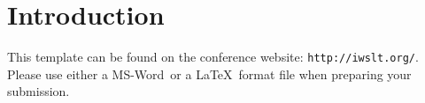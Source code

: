 \section{Introduction} \label{introduction}
This template can be found on the conference 
website: \texttt{http://iwslt.org/}.
Please use either a MS-Word\reg\ or a \LaTeX\ format file
when preparing your submission. 